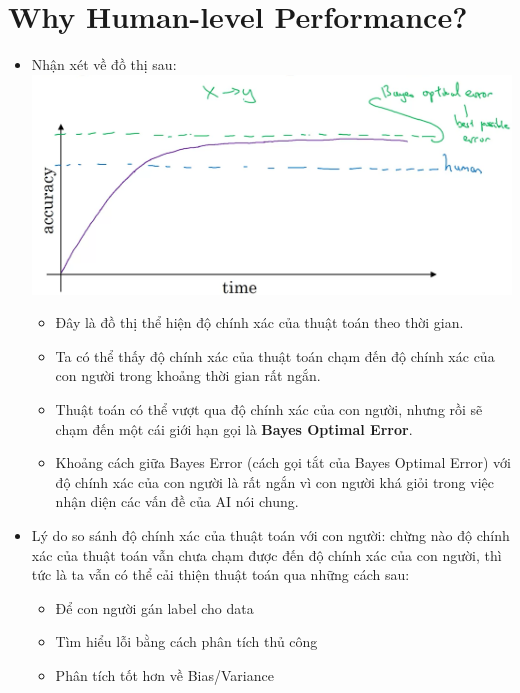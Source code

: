 \documentclass[12pt,a4paper]{report}
\begin{document}
	\section{Why Human-level Performance?}
		\begin{itemize}
			\item Nhận xét về đồ thị sau:\\\includegraphics[scale=0.35]{3}
				\begin{itemize}
					\item Đây là đồ thị thể hiện độ chính xác của thuật toán theo thời gian.
					\item Ta có thể thấy độ chính xác của thuật toán chạm đến độ chính xác của con người trong khoảng thời gian rất ngắn.
					\item Thuật toán có thể vượt qua độ chính xác của con người, nhưng rồi sẽ chạm đến một cái giới hạn gọi là \textbf{Bayes Optimal Error}.
					\item Khoảng cách giữa Bayes Error (cách gọi tắt của Bayes Optimal Error) với độ chính xác của con người là rất ngắn vì con người khá giỏi trong việc nhận diện các vấn đề của AI nói chung.
				\end{itemize}
			\item Lý do so sánh độ chính xác của thuật toán với con người: chừng nào độ chính xác của thuật toán vẫn chưa chạm được đến độ chính xác của con người, thì tức là ta vẫn có thể cải thiện thuật toán qua những cách sau:
				\begin{itemize}
					\item Để con người gán label cho data
					\item Tìm hiểu lỗi bằng cách phân tích thủ công
					\item Phân tích tốt hơn về Bias/Variance
				\end{itemize}
		\end{itemize}
\end{document}
